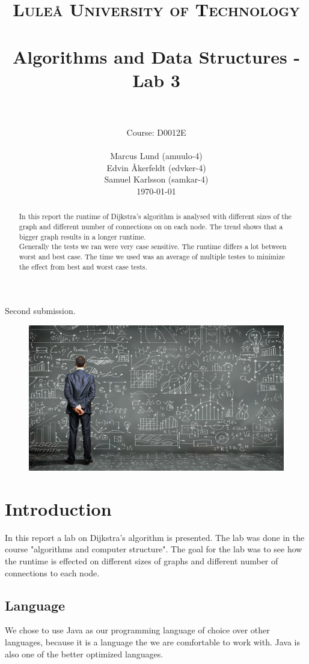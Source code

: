 \documentclass[paper=a4, fontsize=11pt]{scrartcl}
\title{
		\usefont{OT1}{bch}{b}{n}
		\normalfont \normalsize \textsc{Luleå University of Technology} \\ [25pt]
		\horrule{0.5pt} \\[0.4cm]
		\huge Algorithms and Data Structures - Lab 3 \\
		\horrule{2pt} \\[0.5cm]
}
\author{Course: D0012E \\ \\ 
		\normalfont 								\normalsize
        Marcus Lund (amuulo-4) \\\normalfont\normalsize Edvin Åkerfeldt (edvker-4)\\\normalfont\normalsize Samuel Karlsson (samkar-4)\\[-3pt]		\normalsize
        \today
}
\date{}
\numberwithin{equation}{section}		%
\numberwithin{figure}{section}			%
\numberwithin{table}{section}				%
\begin{document}
\maketitle
\centerline{Second submission.}
\begin{figure}[h!]
  \centering
    \includegraphics[width=1\textwidth]{algorithm}
\end{figure}
\newpage

\begin{abstract}
In this report the runtime of Dijkstra’s algorithm is analysed with different sizes of the graph and different number of connections on on each node. The trend shows that a bigger graph results in a longer runtime. 
\\

Generally the tests we ran were very case sensitive. The runtime differs a lot between worst and best case. The time we used was an average of multiple testes to minimize the effect from best and worst case tests.  
\end{abstract}

\tableofcontents
\newpage

\section{Introduction}
In this report a lab on Dijkstra’s algorithm is presented. The lab was done in the course "algorithms and computer structure". The goal for the lab was to see how the runtime is effected on different sizes of graphs and different number of connections to each node.

\subsection{Language}
We chose to use Java as our programming language of choice over other languages, because it is a language the we are comfortable to work with. Java is also one of the better optimized languages.
\end{document}
